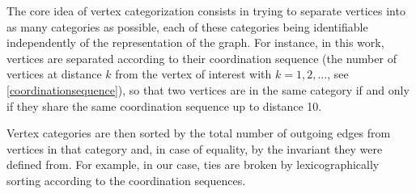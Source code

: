 \documentclass[main.tex]{subfiles}
\begin{document}
The core idea of vertex categorization consists in trying to separate vertices into as many categories as possible, each of these categories being identifiable independently of the representation of the graph. For instance, in this work, vertices are separated according to their coordination sequence (the number of vertices at distance $k$ from the vertex of interest with $k=1,2,...$, see \cref{coordinationsequence}), so that two vertices are in the same category if and only if they share the same coordination sequence up to distance 10.%

Vertex categories are then sorted by the total number of outgoing edges from vertices in that category and, in case of equality, by the invariant they were defined from. For example, in our case, ties are broken by lexicographically sorting according to the coordination sequences.%

%
\end{document}
